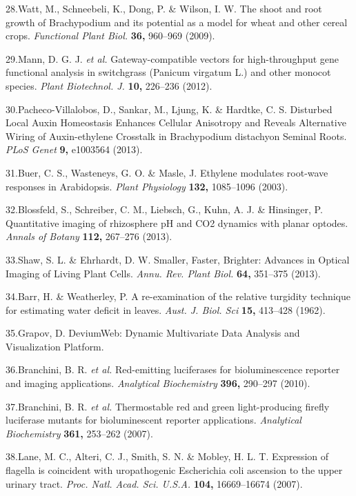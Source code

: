 \documentclass[]{article}
\begin{document}
28.Watt, M., Schneebeli, K., Dong, P. \& Wilson, I. W. The shoot and
root growth of Brachypodium and its potential as a model for wheat and
other cereal crops. \emph{Functional Plant Biol.} \textbf{36,} 960--969
(2009).

29.Mann, D. G. J. \emph{et al.} Gateway-compatible vectors for
high-throughput gene functional analysis in switchgrass (Panicum
virgatum L.) and other monocot species. \emph{Plant Biotechnol. J.}
\textbf{10,} 226--236 (2012).

30.Pacheco-Villalobos, D., Sankar, M., Ljung, K. \& Hardtke, C. S.
Disturbed Local Auxin Homeostasis Enhances Cellular Anisotropy and
Reveals Alternative Wiring of Auxin-ethylene Crosstalk in Brachypodium
distachyon Seminal Roots. \emph{PLoS Genet} \textbf{9,} e1003564 (2013).

31.Buer, C. S., Wasteneys, G. O. \& Masle, J. Ethylene modulates
root-wave responses in Arabidopsis. \emph{Plant Physiology}
\textbf{132,} 1085--1096 (2003).

32.Blossfeld, S., Schreiber, C. M., Liebsch, G., Kuhn, A. J. \&
Hinsinger, P. Quantitative imaging of rhizosphere pH and CO2 dynamics
with planar optodes. \emph{Annals of Botany} \textbf{112,} 267--276
(2013).

33.Shaw, S. L. \& Ehrhardt, D. W. Smaller, Faster, Brighter: Advances in
Optical Imaging of Living Plant Cells. \emph{Annu. Rev. Plant Biol.}
\textbf{64,} 351--375 (2013).

34.Barr, H. \& Weatherley, P. A re-examination of the relative turgidity
technique for estimating water deficit in leaves. \emph{Aust. J. Biol.
Sci} \textbf{15,} 413--428 (1962).

35.Grapov, D. DeviumWeb: Dynamic Multivariate Data Analysis and
Visualization Platform.

36.Branchini, B. R. \emph{et al.} Red-emitting luciferases for
bioluminescence reporter and imaging applications. \emph{Analytical
Biochemistry} \textbf{396,} 290--297 (2010).

37.Branchini, B. R. \emph{et al.} Thermostable red and green
light-producing firefly luciferase mutants for bioluminescent reporter
applications. \emph{Analytical Biochemistry} \textbf{361,} 253--262
(2007).

38.Lane, M. C., Alteri, C. J., Smith, S. N. \& Mobley, H. L. T.
Expression of flagella is coincident with uropathogenic Escherichia coli
ascension to the upper urinary tract. \emph{Proc. Natl. Acad. Sci.
U.S.A.} \textbf{104,} 16669--16674 (2007).
\end{document}

